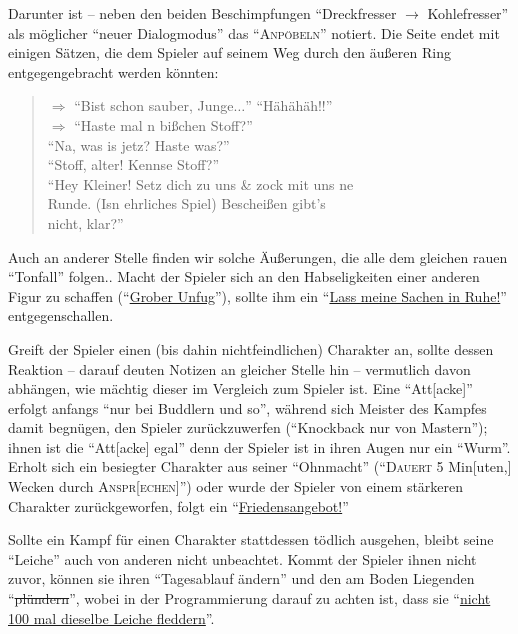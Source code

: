 \documentclass[a5paper,pagesize,numbers=noenddot]{scrbook}
\begin{document}
Darunter ist -- neben den beiden Beschimpfungen \enquote{Dreckfresser $\rightarrow$ Kohlefresser} als möglicher \enquote{neuer Dialogmodus} das \enquote{\textsc{Anpöbeln}} notiert.
Die Seite endet mit einigen Sätzen, die dem Spieler auf seinem Weg durch den äußeren Ring entgegengebracht werden könnten:

\begin{quote}
   $\Rightarrow$ \enquote{Bist schon sauber, Junge$\ldots$} \enquote{Hähähäh!!}\\
   \phantom{$\Rightarrow$} $\Rightarrow$ \enquote{Haste mal n bißchen Stoff?}\\
   \phantom{$\Rightarrow$ $\Rightarrow$} \enquote{Na, was is jetz? Haste was?}\\
   \phantom{$\Rightarrow$ $\Rightarrow$} \enquote{Stoff, alter! Kennse Stoff?}\\
   \phantom{$\Rightarrow$} \enquote{Hey Kleiner! Setz dich zu uns \& zock mit uns ne\\
   \phantom{$\Rightarrow$ \guillemotleft Hey Kleiner} Runde. (Isn ehrliches Spiel) Bescheißen gibt's\\
   \phantom{$\Rightarrow$ \guillemotleft Hey Kleiner Runde. (Isn ehrliches Spiel)} nicht, klar?}
\end{quote}

Auch an anderer Stelle finden wir solche Äußerungen, die alle dem gleichen rauen \enquote{Tonfall} folgen.\autocite[S.~8]{orpheus_b_scribbles}.
Macht der Spieler sich an den Habseligkeiten einer anderen Figur zu schaffen (\enquote{\uline{Grober Unfug}}), sollte ihm ein \enquote{\uline{Lass meine Sachen in Ruhe!}} entgegenschallen.\autocite[S.~9]{orpheus_b_scribbles}

Greift der Spieler einen (bis dahin nichtfeindlichen) Charakter an, sollte dessen Reaktion -- darauf deuten Notizen an gleicher Stelle hin -- vermutlich davon abhängen, wie mächtig dieser im Vergleich zum Spieler ist.
Eine \enquote{Att[acke]} erfolgt anfangs \enquote{nur bei Buddlern und so}, während sich Meister des Kampfes damit begnügen, den Spieler zurückzuwerfen (\enquote{Knockback nur von Mastern}); ihnen ist die \enquote{Att[acke] egal} denn der Spieler ist in ihren Augen nur ein \enquote{Wurm}.
Erholt sich ein besiegter Charakter aus seiner \enquote{Ohnmacht} (\enquote{\textsc{Dauert} 5 Min[uten,] Wecken durch \textsc{Anspr[echen]}}) oder wurde der Spieler von einem stärkeren Charakter zurückgeworfen, folgt ein \enquote{\uline{Friedensangebot!}}

Sollte ein Kampf für einen Charakter stattdessen tödlich ausgehen, bleibt seine \enquote{Leiche} auch von anderen nicht unbeachtet.
Kommt der Spieler ihnen nicht zuvor, können sie ihren \enquote{Tagesablauf ändern} und den am Boden Liegenden \enquote{\sout{plündern}}, wobei in der Programmierung darauf zu achten ist, dass sie \enquote{\uline{nicht 100 mal dieselbe Leiche fleddern}}.
\end{document}
